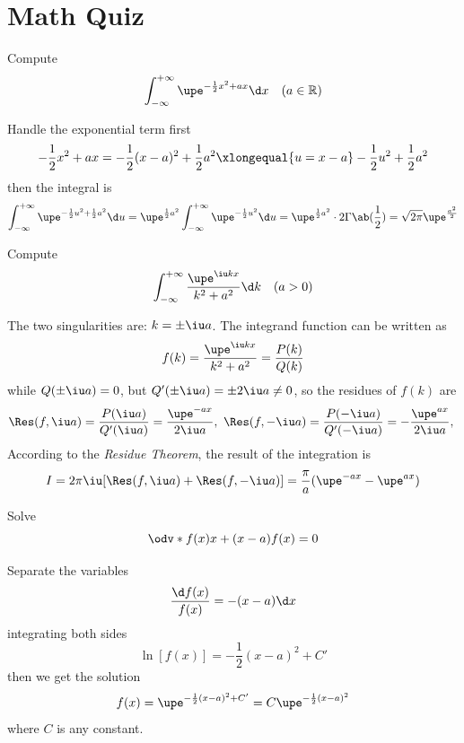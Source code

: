 
\section*{Math Quiz}

\begin{problem}
  Compute
  \[
    \int_{-\infty}^{+\infty} \upe^{-\frac12x^2+ax} \d x \quad (a \in \mathbb R)
  \]
\end{problem}
\begin{solution}
  Handle the exponential term first
  \[
    -\frac12 x^2 + ax = -\frac12 (x - a)^2 + \frac12 a^2
    \xlongequal{u=x-a} -\frac12 u^2 + \frac12 a^2
  \]
  then the integral is
  \begin{align*}
    \int_{-\infty}^{+\infty} \upe^{-\frac12 u^2 + \frac12 a^2} \d u
  = \upe^{\frac12 a^2} \int_{-\infty}^{+\infty} \upe^{-\frac12 u^2} \d u
  = \upe^{\frac12 a^2} \cdot 2\Gamma\ab(\frac12)
  = \sqrt{2\pi} \upe^{\frac{a^2}{2}}
  \end{align*}
\end{solution}

\begin{problem}
  Compute
  \[
    \int_{-\infty}^{+\infty} \frac{\upe^{\iu kx}}{k^2+a^2} \d k \quad (a > 0)
  \]
\end{problem}
\begin{solution}
  The two singularities are: $k = \pm \iu a$.
  The integrand function can be written as
  \[
    f(k) = \frac{\upe^{\iu kx}}{k^2 + a^2} = \frac{P(k)}{Q(k)}
  \]
  while $Q(\pm \iu a) = 0$, but $Q'(\pm \iu a) = \pm 2\iu a \neq 0$,
  so the residues of $f(k)$ are
  \[
    \Res(f,\iu a) = \frac{P(\iu a)}{Q'(\iu a)} = \frac{\upe^{-ax}}{2\iu a},~
    \Res(f,-\iu a) = \frac{P(-\iu a)}{Q'(-\iu a)} = -\frac{\upe^{ax}}{2\iu a},~
  \]
  According to the \emph{Residue Theorem}, the result of the integration is
  \[
    I = 2\pi \iu[\Res(f,\iu a) + \Res(f,-\iu a)] = \frac \pi a (\upe^{-ax} - \upe^{ax})
  \]
\end{solution}

\begin{problem}
  Solve
  \[
    \odv*{f(x)}x + (x - a) f(x) = 0
  \]
\end{problem}
\begin{solution}
  Separate the variables
  \[
    \frac{\d f(x)}{f(x)} = -(x - a) \d x
  \]
  integrating both sides
  \[
    \ln[f(x)] = -\frac12 (x - a)^2 + C'
  \]
  then we get the solution
  \[
    f(x) = \upe^{-\frac12(x - a)^2 + C'} = C\upe^{-\frac12(x - a)^2}
  \]
  where $C$ is any constant.
\end{solution}

